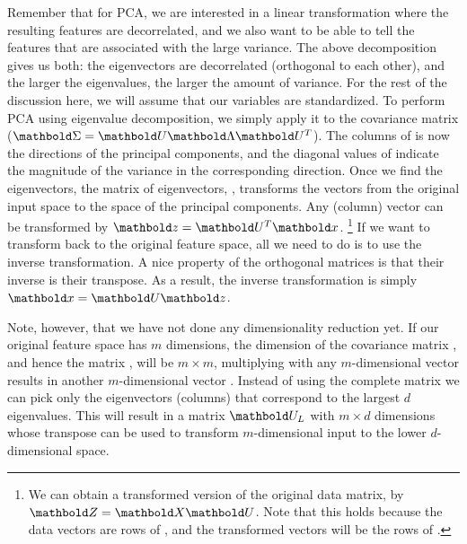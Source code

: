 Remember that for PCA,
we are interested in a linear transformation
where the resulting features are decorrelated,
and we also want to be able to tell the features that are associated with 
the large variance.
The above decomposition gives us both:
the eigenvectors are decorrelated (orthogonal to each other),
and the larger the eigenvalues, the larger the amount of variance.
For the rest of the discussion here,
we will assume that our variables are standardized.%
To perform PCA using eigenvalue decomposition,
we simply apply it to the covariance matrix
($\vect{\Sigma} = \vect{U}\vect{\Lambda}\vect{U}^{T}$).%
The columns of  is now the directions of the principal components,
and the diagonal values of \vect{\Lambda} indicate
the magnitude of the variance in the corresponding direction.
Once we find the eigenvectors, 
the matrix of eigenvectors, ,
transforms the vectors from the original input space
to the space of the principal components.
Any (column) vector  can be transformed
by $\vect{z} = \vect{U}^{T}\vect{x}$.%
\footnote{%
  We can obtain a transformed version of the original data matrix,
  by $\vect{Z} = \vect{X}\vect{U}$.
  Note that this holds because
  the data vectors are rows of ,
  and the transformed vectors will be the rows of .
}
If we want to transform  back to the original feature space,
all we need to do is to use the inverse transformation.
A nice property of the orthogonal matrices is that their inverse
is their transpose.
As a result,
the inverse transformation is simply $\vect{x} = \vect{U}\vect{z}$.

Note, however, that we have not done any dimensionality reduction yet.
If our original feature space has $m$ dimensions,
the dimension of the covariance matrix \vect{\Sigma},
and hence the matrix , will be $m\times{}m$,
multiplying  with any $m$-dimensional vector 
results in another $m$-dimensional vector .
Instead of using the complete matrix  we can pick only 
the eigenvectors (columns) that correspond to the largest $d$ eigenvalues.
This will result in a matrix $\vect{U}_{L}$ with $m\times{}d$ dimensions
whose transpose can be used to transform $m$-dimensional input to
the lower $d$-dimensional space.

